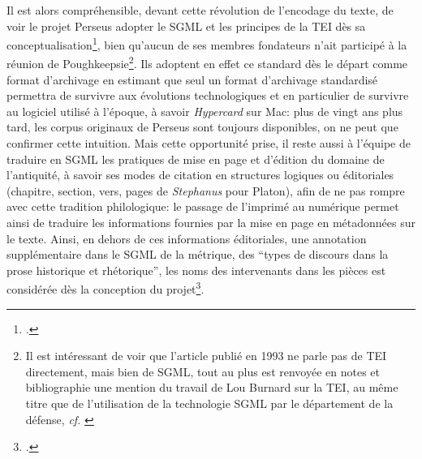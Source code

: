 Il est alors compréhensible, devant cette révolution de l'encodage du texte, de voir le projet Perseus adopter le SGML et les principes de la TEI dès sa conceptualisation\footcite[p. 138]{mylonas_perseus_1993}, bien qu'aucun de ses membres fondateurs n'ait participé à la réunion de Poughkeepsie\footnote{Il est intéressant de voir que l'article publié en 1993 ne parle pas de TEI directement, mais bien de SGML, tout au plus est renvoyée en notes et bibliographie une mention du travail de Lou Burnard sur la TEI, au même titre que de l'utilisation de la technologie SGML par le département de la défense, \textit{cf.} \cite[notes 8 et 9, p.~155]{mylonas_perseus_1993}}. Ils adoptent en effet ce standard dès le départ comme format d'archivage en estimant que seul un format d'archivage standardisé permettra de survivre aux évolutions technologiques et en particulier de survivre au logiciel utilisé à l'époque, à savoir \textit{Hypercard} sur Mac: plus de vingt ans plus tard, les corpus originaux de Perseus sont toujours disponibles, on ne peut que confirmer cette intuition. Mais cette opportunité prise, il reste aussi à l'équipe de traduire en SGML les pratiques de mise en page et d'édition du domaine de l'antiquité, à savoir ses modes de citation en structures logiques ou éditoriales (chapitre, section, vers, pages de \textit{Stephanus} pour Platon), afin de ne pas rompre avec cette tradition philologique: le passage de l'imprimé au numérique permet ainsi de traduire les informations fournies par la mise en page en métadonnées sur le texte. Ainsi, en dehors de ces informations éditoriales, une annotation supplémentaire dans le SGML de la métrique, des \enquote{types de discours dans la prose historique et rhétorique}, les noms des intervenants dans les pièces est considérée dès la conception du projet\footcite[p. 137]{mylonas_perseus_1993}.

